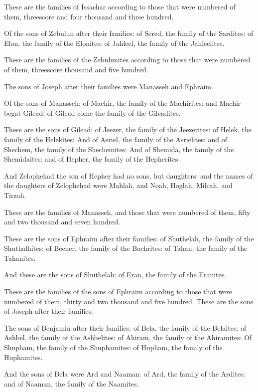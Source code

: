 \verse These are the families of Issachar according to those that were
numbered of them, threescore and four thousand and three hundred.

\verse Of the sons of Zebulun after their families: of Sered, the
family of the Sardites: of Elon, the family of the Elonites: of
Jahleel, the family of the Jahleelites.

\verse These are the families of the Zebulunites according to those
that were numbered of them, threescore thousand and five hundred.

\verse The sons of Joseph after their families were Manasseh and
Ephraim.

\verse Of the sons of Manasseh: of Machir, the family of the
Machirites: and Machir begat Gilead: of Gilead come the family of the
Gileadites.

\verse These are the sons of Gilead: of Jeezer, the family of the
Jeezerites: of Helek, the family of the Helekites: \verse And of
Asriel, the family of the Asrielites: and of Shechem, the family of
the Shechemites: \verse And of Shemida, the family of the Shemidaites:
and of Hepher, the family of the Hepherites.

\verse And Zelophehad the son of Hepher had no sons, but daughters: and
the names of the daughters of Zelophehad were Mahlah, and Noah,
Hoglah, Milcah, and Tirzah.

\verse These are the families of Manasseh, and those that were numbered
of them, fifty and two thousand and seven hundred.

\verse These are the sons of Ephraim after their families: of
Shuthelah, the family of the Shuthalhites: of Becher, the family of
the Bachrites: of Tahan, the family of the Tahanites.

\verse And these are the sons of Shuthelah: of Eran, the family of the
Eranites.

\verse These are the families of the sons of Ephraim according to those
that were numbered of them, thirty and two thousand and five hundred.
These are the sons of Joseph after their families.

\verse The sons of Benjamin after their families: of Bela, the family
of the Belaites: of Ashbel, the family of the Ashbelites: of Ahiram,
the family of the Ahiramites: \verse Of Shupham, the family of the
Shuphamites: of Hupham, the family of the Huphamites.

\verse And the sons of Bela were Ard and Naaman: of Ard, the family of
the Ardites: and of Naaman, the family of the Naamites.

